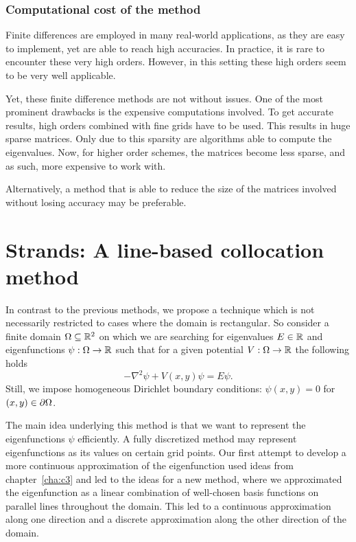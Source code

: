 \subsubsection{Computational cost of the method}

Finite differences are employed in many real-world applications, as they are easy to implement, yet are able to reach high accuracies. In practice, it is rare to encounter these very high orders. However, in this setting these high orders seem to be very well applicable.

Yet, these finite difference methods are not without issues. One of the most prominent drawbacks is the expensive computations involved. To get accurate results, high orders combined with fine grids have to be used. This results in huge sparse matrices. Only due to this sparsity are algorithms able to compute the eigenvalues. Now, for higher order schemes, the matrices become less sparse, and as such, more expensive to work with.

Alternatively, a method that is able to reduce the size of the matrices involved without losing accuracy may be preferable.

\section[Strands: line-based collocation method]{Strands: A line-based collocation method}\label{sec:c4_strands}

In contrast to the previous methods, we propose a technique which is not necessarily restricted to cases where the domain is rectangular. So consider a finite domain $\Omega \subseteq \mathbb{R}^2$ on which we are searching for eigenvalues $E \in \mathbb{R}$ and eigenfunctions $\psi: \Omega \to \mathbb{R}$ such that for a given potential $V : \Omega \to \mathbb{R}$ the following holds
\begin{equation}\label{equ:c4_schrodinger_equation_new_method}
    -\nabla^2 \psi + V(x, y) \psi = E \psi\text{.}
\end{equation}
Still, we impose homogeneous Dirichlet boundary conditions: $\psi(x, y) = 0$ for $(x, y) \in \partial\Omega$.

The main idea underlying this method is that we want to represent the eigenfunctions $\psi$ efficiently. A fully discretized method may represent eigenfunctions as its values on certain grid points. Our first attempt to develop a more continuous approximation of the eigenfunction used ideas from chapter~\ref{cha:c3} and led to the ideas for a new method, where we approximated the eigenfunction as a linear combination of well-chosen basis functions on parallel lines throughout the domain. This led to a continuous approximation along one direction and a discrete approximation along the other direction of the domain.

